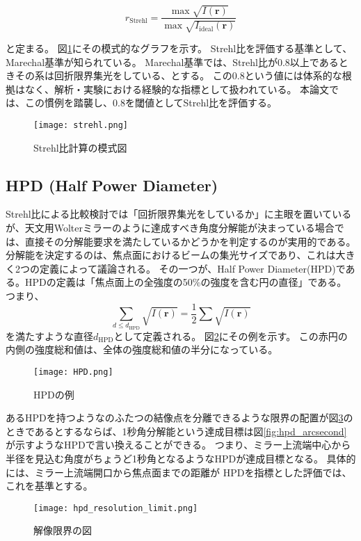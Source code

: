 \[
r_{\mathrm{Strehl}} = \frac{ \max{\sqrt{I(\mathbf{r})} } }{ \max{ \sqrt{I_{\mathrm{ideal}}( \mathbf{r} )} } }
\]

と定まる。
図\ref{fig:strehl_explanation}にその模式的なグラフを示す。
Strehl比を評価する基準として、Marechal基準\cite{Bornwolf:1999:Book}が知られている。
Marechal基準では、Strehl比が0.8以上であるときその系は回折限界集光をしている、とする。
この0.8という値には体系的な根拠はなく、解析・実験における経験的な指標として扱われている。
本論文では、この慣例を踏襲し、0.8を閾値としてStrehl比を評価する。

\begin{figure}[h]
\centering
\texttt{[image: strehl.png]}
\caption{Strehl比計算の模式図}
\label{fig:strehl_explanation}
\end{figure}

\subsection{HPD (Half Power Diameter)}
\label{chap2_hpd}

Strehl比による比較検討では「回折限界集光をしているか」に主眼を置いているが、天文用Wolterミラーのように達成すべき角度分解能が決まっている場合では、直接その分解能要求を満たしているかどうかを判定するのが実用的である。
分解能を決定するのは、焦点面におけるビームの集光サイズであり、これは大きく2つの定義によって議論される。
その一つが、Half Power Diameter(HPD)である。HPDの定義は「焦点面上の全強度の50\%の強度を含む円の直径」である。つまり、
\[
    \sum_{d\leq d_{\mathrm{HPD}}} \sqrt{ I(\mathbf{r}) } = \frac{1}{2} \sum \sqrt{ I(\mathbf{r}) }
\]
を満たすような直径$d_{\mathrm{HPD}}$として定義される。
図\ref{fig:hpd_explanation}にその例を示す。
この赤円の内側の強度総和値は、全体の強度総和値の半分になっている。

\begin{figure}[!ht]
\centering
\texttt{[image: HPD.png]}
\caption{HPDの例}
\label{fig:hpd_explanation}
\end{figure}

あるHPDを持つようなのふたつの結像点を分離できるような限界の配置が図\ref{fig:hpd_resolution_limit}のときであるとするならば、1秒角分解能という達成目標は図\ref{fig:hpd_arcsecond}が示すようなHPDで言い換えることができる。
つまり、ミラー上流端中心から半径を見込む角度がちょうど1秒角となるようなHPDが達成目標となる。
具体的には、ミラー上流端開口から焦点面までの距離が
HPDを指標とした評価では、これを基準とする。

\begin{figure}[ht]
\centering
\texttt{[image: hpd\_resolution\_limit.png]}
\caption{解像限界の図}
\label{fig:hpd_resolution_limit}
\end{figure}

